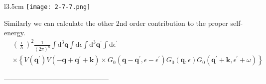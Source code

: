 \begin{wrapfigure}[4]{l}{3.5cm}
\label{Fig2.7.7} \texttt{[image: 2-7-7.png]}
\end{wrapfigure}
Similarly we can calculate the other 2nd order contribution to the proper self-energy.
\[ \begin{split} & \left(\frac{\imath}{\hbar}\right)^2 \frac{1}{(2\pi)^8} \int \mathrm{d}^3 \mathbf{q} \int \mathrm{d} \epsilon \int \mathrm{d}^3 \mathbf{q}^{'} \int \mathrm{d} \epsilon^{'}  \\
& \times \left\{ V(\mathbf{q}^{'})V(-\mathbf{q} + \mathbf{q}^{'}+\mathbf{k})
\times G_0(\mathbf{q}-\mathbf{q}^{'},\epsilon-\epsilon^{'})G_0(\mathbf{q},\epsilon)G_0(\mathbf{q}^{'}+\mathbf{k},\epsilon^{'}+\omega) \right\} \end{split}\]
\begin{center}---------------------------------------------\end{center}
